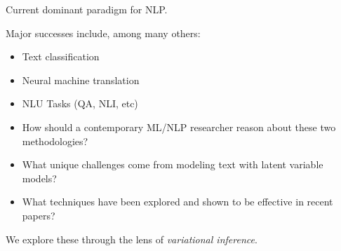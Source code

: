\begin{frame}
    Current dominant paradigm for NLP.
    \vspace{0.5cm}

    Major successes include, among many others:
    \begin{itemize}
        \item Text classification  \cite{}  
        \item Neural machine translation \cite{} 
        \item NLU Tasks (QA, NLI, etc) \cite{}
    \end{itemize}
\end{frame}

\begin{frame}{}
    \begin{itemize}
        \item 

    How should a contemporary ML/NLP researcher reason about these two methodologies?
    \vspace{0.5cm}

        \item 
   
    What unique challenges come from modeling text with latent variable models?   

    \vspace{0.5cm}

        \item 
   
    What techniques have been explored and shown to be effective in recent papers? 
    \end{itemize}
 

   
    \pause
    \air
    
    We explore these through the lens of \textit{variational inference}.    
\end{frame}


